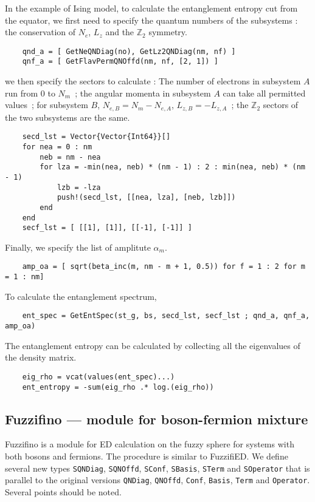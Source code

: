\documentclass{timesjhep}
\begin{document}
In the example of Ising model, to calculate the entanglement entropy cut from the equator, we first need to specify the quantum numbers of the subsystems : the conservation of $N_e$, $L_z$ and the $\mathbb{Z}_2$ symmetry.
\begin{lstlisting}
    qnd_a = [ GetNeQNDiag(no), GetLz2QNDiag(nm, nf) ]
    qnf_a = [ GetFlavPermQNOffd(nm, nf, [2, 1]) ]
\end{lstlisting}
we then specify the sectors to calculate : The number of electrons in subsystem $A$ run from $0$ to $N_m$~; the angular momenta in subsystem $A$ can take all permitted values~; for subsystem $B$, $N_{e,B}=N_m-N_{e,A}$, $L_{z,B}=-L_{z,A}$~; the $\mathbb{Z}_2$ sectors of the two subsystems are the same. 
\begin{lstlisting}
    secd_lst = Vector{Vector{Int64}}[]
    for nea = 0 : nm 
        neb = nm - nea 
        for lza = -min(nea, neb) * (nm - 1) : 2 : min(nea, neb) * (nm - 1)
            lzb = -lza 
            push!(secd_lst, [[nea, lza], [neb, lzb]])
        end
    end
    secf_lst = [ [[1], [1]], [[-1], [-1]] ]
\end{lstlisting}
Finally, we specify the list of amplitute $\alpha_m$.
\begin{lstlisting}
    amp_oa = [ sqrt(beta_inc(m, nm - m + 1, 0.5)) for f = 1 : 2 for m = 1 : nm]
\end{lstlisting}
To calculate the entanglement spectrum, 
\begin{lstlisting}
    ent_spec = GetEntSpec(st_g, bs, secd_lst, secf_lst ; qnd_a, qnf_a, amp_oa)
\end{lstlisting}
The entanglement entropy can be calculated by collecting all the eigenvalues of the density matrix.
\begin{lstlisting}
    eig_rho = vcat(values(ent_spec)...)
    ent_entropy = -sum(eig_rho .* log.(eig_rho))
\end{lstlisting}

\subsection{Fuzzifino --- module for boson-fermion mixture}
\label{sec:ed_fuzzifino}

Fuzzifino is a module for ED calculation on the fuzzy sphere for systems with both bosons and fermions. The procedure is similar to FuzzifiED. We define several new types \lstinline|SQNDiag|, \lstinline|SQNOffd|, \lstinline|SConf|, \lstinline|SBasis|, \lstinline|STerm| and \lstinline|SOperator| that is parallel to the original versions \lstinline|QNDiag|, \lstinline|QNOffd|, \lstinline|Conf|, \lstinline|Basis|, \lstinline|Term| and \lstinline|Operator|. Several points should be noted.
\end{document}
